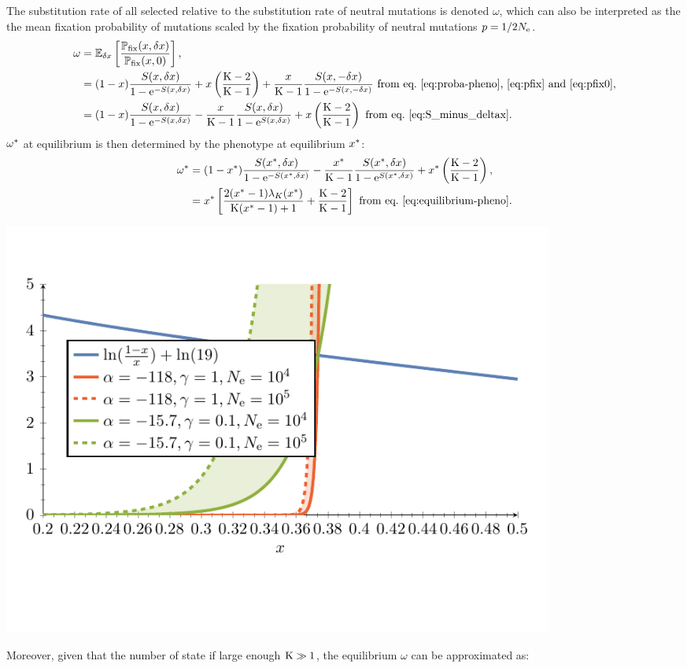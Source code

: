 The substitution rate of all selected relative to the substitution rate of neutral mutations is denoted $\omega$, which can also be interpreted as the the mean fixation probability of mutations scaled by the fixation probability of neutral mutations $p = 1 / {2 N_{\mathrm{e}}}$.
\begin{align}
\omega & = \operatorname{\mathbb{E}}_{\delta x} \left[ \frac{\mathbb{P}_{\mathrm{fix}}(x, \delta x)}{\mathbb{P}_{\mathrm{fix}}(x, 0)} \right], \\
 & = (1 - x) \frac{ S(x, \delta x)}{1 - \mathrm{e}^{-S(x, \delta x)}} + x \left(\frac{\text{K} - 2}{\text{K} - 1}\right) + \frac{x}{\text{K}-1} \frac{ S(x, -\delta x)}{1 - \mathrm{e}^{-S(x, -\delta x)}} \text{ from eq.~\ref{eq:proba-pheno},~\ref{eq:pfix} and~\ref{eq:pfix0}}, \\
 & = (1 - x) \frac{ S(x, \delta x)}{1 - \mathrm{e}^{-S(x, \delta x)}} - \frac{x}{\text{K}-1}  \frac{ S(x, \delta x)}{1 - \mathrm{e}^{S(x, \delta x)}} +  x \left(\frac{\text{K} - 2}{\text{K} - 1}\right) \text{ from eq.~\ref{eq:S_minus_deltax}}.
\end{align}
$\omega^{*}$ at equilibrium is then determined by the phenotype at equilibrium $x^{*}$:
\begin{align}
\omega^{*} &= (1 - x^{*}) \frac{ S(x^{*}, \delta x)}{1 - \mathrm{e}^{-S(x^{*}, \delta x)}} - \frac{x^{*}}{\text{K}-1} \frac{ S(x^{*}, \delta x)}{1 - \mathrm{e}^{S(x^{*}, \delta x)}} + x^{*} \left(\frac{\text{K} - 2}{\text{K} - 1}\right) , \\
 &= x^{*} \left[ \frac{2 (x^{*}-1)  \lambda_{K}(x^{*}) }{\text{K} (x^{*}-1)+1} + \frac{\text{K} - 2}{\text{K} - 1}\right] \text{ from eq.~\ref{eq:equilibrium-pheno}}.
\end{align}
\begin{center}
 \includegraphics[width=0.8\textwidth, page=2] {analytical-relaxation}
\end{center}
Moreover, given that the number of state if large enough $\text{K} \gg 1$, the equilibrium $\omega$ can be approximated as:
